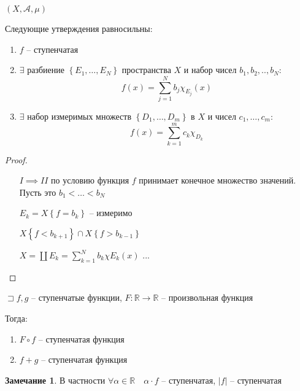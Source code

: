 \documentclass{book}
\newcommand\R{\ensuremath{\mathbb{R}}}
\theoremstyle{definition}
\newtheorem*{note}{Замечание}
\begin{document}
\begin{statement}

    $\left( X, \mathcal A, \mu \right) $ 

    Следующие утверждения равносильны:
    \begin{enumerate}
        \item $f$ -- ступенчатая
        \item  $\exists $ разбиение $\left\{ E_1, \ldots, E_N \right\} $ пространства $X$ и набор чисел  $b_1, b_2, .., b_N$: \[f(x) = \sum_{j=1}^{N} b_j\chi_{E_j}(x)\]
        \item $\exists $ набор измеримых множеств $\left\{ D_1, \ldots, D_m \right\} $ в $X$ и чисел  $c_1, \ldots, c_m$: \[f\left(x \right) =\sum_{k=1}^{m} c_k\chi_{D_k}\]
    \end{enumerate}
\end{statement}
\begin{proof}
     \begin{itemize}
         \item []
         \item [$I\implies II$] по условию функция $f$ принимает конечное множество значений. Пусть это  $b_1 < \ldots < b_N$

             $E_k = X\left\{ f = b_k \right\} $ -- измеримо

             $X\left\{ f< b_{k+1} \right\} \cap X\left\{ f > b_{k-1} \right\} $

             $X = \coprod E_k = \sum_{k=1}^{N} b_k \chi{E_k}(x)$
             ...
    \end{itemize}
\end{proof}

\begin{statement}
    $\sqsupset f, g$ -- ступенчатые функции, $F: \R\to \R$ -- произвольная функция

    Тогда:
    \begin{enumerate}
        \item $F\circ f$ -- ступенчатая функция
        \item $f + g$ -- ступенчатая функция
    \end{enumerate}
\end{statement}

\begin{note}
    В частности $\forall \alpha\in \R\quad \alpha \cdot  f$ -- ступенчатая, $|f|$ -- ступенчатая
\end{note}
\end{document}
